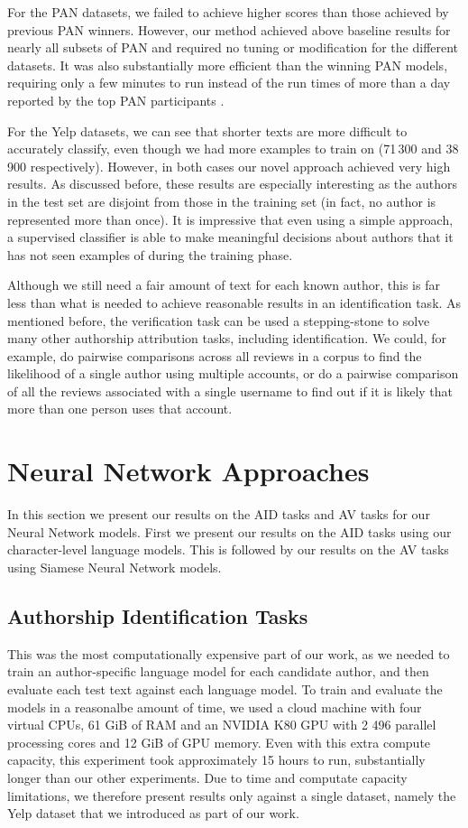 For the PAN datasets, we failed to achieve higher scores than those achieved by previous PAN winners. However, our method achieved above baseline results for nearly all subsets of PAN and required no tuning or modification for the different datasets. It was also substantially more efficient than the winning PAN models, requiring only a few minutes to run instead of the run times of more than a day reported by the top PAN participants \cite{stamatatos2015overview}.

For the Yelp datasets, we can see that shorter texts are more difficult to accurately classify, even though we had more examples to train on (71\,300 and 38\,900 respectively). However, in both cases our novel approach achieved very high results. As discussed before, these results are especially interesting as the authors in the test set are disjoint from those in the training set (in fact, no author is represented more than once). It is impressive that even using a simple approach, a supervised classifier is able to make meaningful decisions about authors that it has not seen examples of during the training phase.

Although we still need a fair amount of text for each known author, this is far less than what is needed to achieve reasonable results in an identification task. As mentioned before, the verification task can be used a stepping-stone to solve many other authorship attribution tasks, including identification. We could, for example, do pairwise comparisons across all reviews in a corpus to find the likelihood of a single author using multiple accounts, or do a pairwise comparison of all the reviews associated with a single username to find out if it is likely that more than one person uses that account.


\section{Neural Network Approaches}
In this section we present our results on the AID tasks and AV tasks for our Neural Network models. First we present our results on the AID tasks using our character-level language models. This is followed by our results on the AV tasks using Siamese Neural Network models.

\subsection{Authorship Identification Tasks}
\label{res:nn-aid}
This was the most computationally expensive part of our work, as we needed to train an author-specific language model for each candidate author, and then evaluate each test text against each language model. To train and evaluate the models in a reasonalbe amount of time, we used a cloud machine with four virtual CPUs, 61 GiB of RAM and an NVIDIA K80 GPU with 2 496 parallel processing cores and 12 GiB of GPU memory. Even with this extra compute capacity, this experiment took approximately 15 hours to run, substantially longer than our other experiments. Due to time and computate capacity limitations, we therefore present results only against a single dataset, namely the Yelp dataset that we introduced as part of our work.

